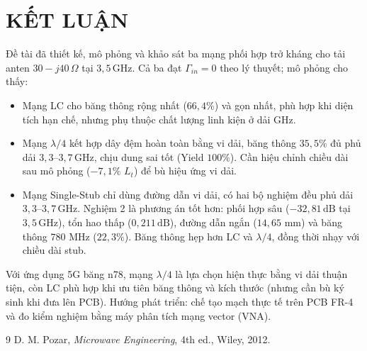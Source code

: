 \documentclass[a4paper]{report}
\newcommand\dB{\,\mathrm{dB}}
\newcommand\GHz{\,\mathrm{GHz}}
\begin{document}
\section{KẾT LUẬN}
Đề tài đã thiết kế, mô phỏng và khảo sát ba mạng phối hợp trở kháng cho tải anten $30-j40\,\Omega$ tại $3{,}5\GHz$. Cả ba đạt $\Gamma_{in}=0$ theo lý thuyết; mô phỏng cho thấy:
\begin{itemize}
  \item Mạng LC cho băng thông rộng nhất ($66{,}4\%$) và gọn nhất, phù hợp khi diện tích hạn chế, nhưng phụ thuộc chất lượng linh kiện ở dải GHz.
  \item Mạng $\lambda/4$ kết hợp dây đệm hoàn toàn bằng vi dải, băng thông $35{,}5\%$ đủ phủ dải $3{,}3$--$3{,}7\GHz$, chịu dung sai tốt (Yield $100\%$). Cần hiệu chỉnh chiều dài sau mô phỏng ($-7{,}1\%$ $L_t$) để bù hiệu ứng vi dải.
  \item Mạng Single-Stub chỉ dùng đường dẫn vi dải, có hai bộ nghiệm đều phủ dải $3{,}3$--$3{,}7\GHz$. Nghiệm 2 là phương án tốt hơn: phối hợp sâu ($-32{,}81\dB$ tại $3{,}5\GHz$), tổn hao thấp ($0{,}211\dB$), đường dẫn ngắn ($14{,}65$ mm) và băng thông $780$ MHz ($22{,}3\%$). Băng thông hẹp hơn LC và $\lambda/4$, đồng thời nhạy với chiều dài stub.
\end{itemize}
Với ứng dụng 5G băng n78, mạng $\lambda/4$ là lựa chọn hiện thực bằng vi dải thuận tiện, còn LC phù hợp khi ưu tiên băng thông và kích thước (nhưng cần bù ký sinh khi đưa lên PCB). Hướng phát triển: chế tạo mạch thực tế trên PCB FR-4 và đo kiểm nghiệm bằng máy phân tích mạng vector (VNA).

\phansau
\begin{thebibliography}{9}
 D. M. Pozar, \emph{Microwave Engineering}, 4th ed., Wiley, 2012.
\end{thebibliography}
\end{document}
